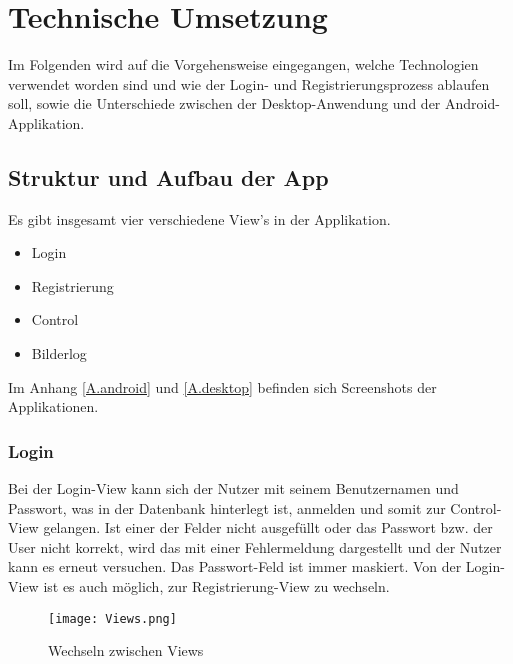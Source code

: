 				
				
\chapter{Technische Umsetzung}
Im Folgenden wird auf die Vorgehensweise eingegangen, welche Technologien verwendet worden sind und wie der Login- und Registrierungsprozess ablaufen soll, sowie die Unterschiede zwischen der Desktop-Anwendung und der Android-Applikation.



\section{Struktur und Aufbau der App}
Es gibt insgesamt vier verschiedene View's in der Applikation.
\begin{itemize}
	\item Login
	\item Registrierung
	\item Control
	\item Bilderlog
\end{itemize}

Im Anhang \ref{A.android} und \ref{A.desktop} befinden sich Screenshots der Applikationen.\\

\subsection{Login}
Bei der Login-View kann sich der Nutzer mit seinem Benutzernamen und Passwort, was in der Datenbank hinterlegt ist, anmelden und somit zur Control-View gelangen. Ist einer der Felder nicht ausgefüllt oder das Passwort bzw. der User nicht korrekt, wird das mit einer Fehlermeldung dargestellt und der Nutzer kann es erneut versuchen. Das Passwort-Feld ist immer maskiert. Von der Login-View ist es auch möglich, zur Registrierung-View zu wechseln.\\


\begin{figure}[h]
  \begin{center}
    \texttt{[image: Views.png]}
  		  \caption{Wechseln zwischen Views}
     \label{fig.Views}
  \end{center}
\end{figure}


